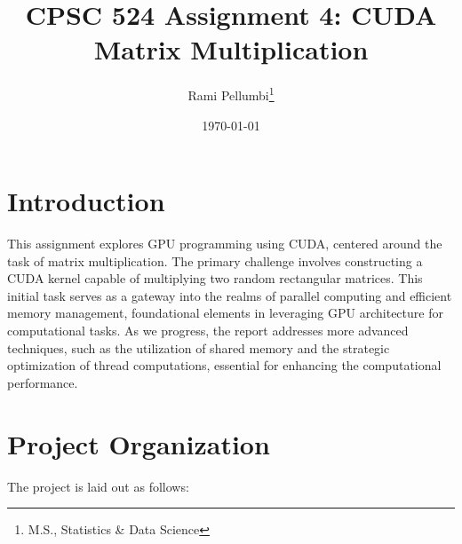 \documentclass{article}
\title{CPSC 524 Assignment 4: CUDA Matrix Multiplication}
\author{Rami Pellumbi\thanks{M.S., Statistics \& Data Science}}
\date{\today}
\begin{document}
\maketitle

\newpage 

\section{Introduction}
This assignment explores GPU programming using CUDA, centered around the task of matrix multiplication. 
The primary challenge involves constructing a CUDA kernel capable of 
multiplying two random rectangular matrices. This initial task serves as a 
gateway into the realms of parallel computing and efficient memory management, 
foundational elements in leveraging GPU architecture for computational tasks. 
As we progress, the report addresses more advanced techniques, such as the 
utilization of shared memory and the strategic optimization of thread 
computations, essential for enhancing the computational performance. 

\section{Project Organization}

The project is laid out as follows:
\end{document}
